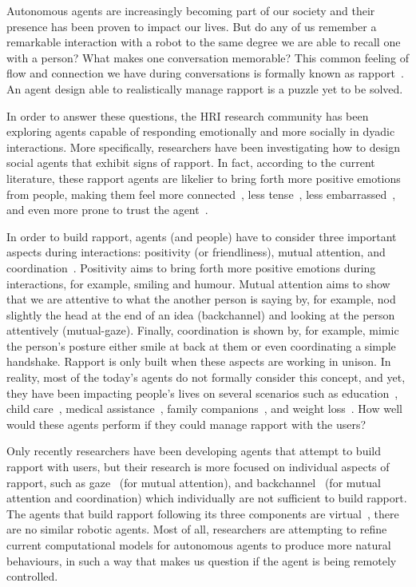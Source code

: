 \label{chap:intro}

Autonomous agents are increasingly becoming part of our society and their presence has been proven to impact our lives. But do any of us remember a remarkable interaction with a robot to the same degree we are able to recall one with a person? What makes one conversation memorable? This common feeling of flow and connection we have during conversations is formally known as rapport~\cite{Wang2009}. An agent design able to realistically manage rapport is a puzzle yet to be solved.

In order to answer these questions, the \ac{HRI} research community has been exploring agents capable of responding emotionally and more socially in dyadic interactions. More specifically, researchers have been investigating how to design social agents that exhibit signs of rapport. In fact, according to the current literature, these rapport agents are likelier to bring forth more positive emotions from people, making them feel more connected~\cite{Rosenthal-vonderPutten2013, Tsai2012}, less tense~\cite{Wang2010}, less embarrassed~\cite{Kang2009}, and even more prone to trust the agent~\cite{Kang2009}.

In order to build rapport, agents (and people) have to consider three important aspects during interactions: positivity (or friendliness), mutual attention, and coordination~\cite{Spencer-Oatey2005}. Positivity aims to bring forth more positive emotions during interactions, for example, smiling and humour. Mutual attention aims to show that we are attentive to what the another person is saying by, for example, nod slightly the head at the end of an idea (backchannel) and looking at the person attentively (mutual-gaze). Finally, coordination is shown by, for example, mimic the person's posture either smile at back at them or even coordinating a simple handshake. Rapport is only built when these aspects are working in unison. In reality, most of the today's agents do not formally consider this concept, and yet, they have been impacting people's lives on several scenarios such as education~\cite{Burroughs2007}, child care~\cite{Burns1984}, medical assistance~\cite{Marti2006, Kang2005, Lisetti2013}, family companions~\cite{Bickmore2005}, and weight loss~\cite{Fasola2012}. How well would these agents perform if they could manage rapport with the users?

Only recently researchers have been developing agents that attempt to build rapport with users, but their research is more focused on individual aspects of rapport, such as gaze~\cite{Skantze2013, Andrist2015, Mutlu2006, Stanton2014, Peters2005, Andrist2014, Baxter2014, Wang2010} (for mutual attention), and backchannel~\cite{Truong2011, Morency2008, Huang2010, Poppe2011, Poppe2010, Kok2012, Niewiadomski2009} (for mutual attention and coordination) which individually are not sufficient to build rapport. The agents that build rapport following its three components are virtual~\cite{Buschmeier2011, Gratch2006}, there are no similar robotic agents. Most of all, researchers are attempting to refine current computational models for autonomous agents to produce more natural behaviours, in such a way that makes us question if the agent is being remotely controlled. 

